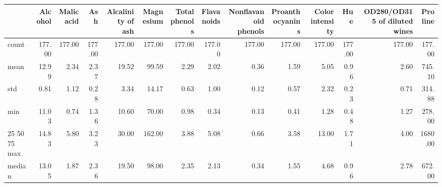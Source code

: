 \begin{tabular}{lrrrrrrrrrrrrr}
\toprule
 & Alcohol & Malic acid & Ash & Alcalinity of ash & Magnesium & Total phenols & Flavanoids & Nonflavanoid phenols & Proanthocyanins & Color intensity & Hue & OD280/OD315 of diluted wines & Proline \\
\midrule
count & 177.00 & 177.00 & 177.00 & 177.00 & 177.00 & 177.00 & 177.00 & 177.00 & 177.00 & 177.00 & 177.00 & 177.00 & 177.00 \\
mean & 12.99 & 2.34 & 2.37 & 19.52 & 99.59 & 2.29 & 2.02 & 0.36 & 1.59 & 5.05 & 0.96 & 2.60 & 745.10 \\
std & 0.81 & 1.12 & 0.28 & 3.34 & 14.17 & 0.63 & 1.00 & 0.12 & 0.57 & 2.32 & 0.23 & 0.71 & 314.88 \\
min & 11.03 & 0.74 & 1.36 & 10.60 & 70.00 & 0.98 & 0.34 & 0.13 & 0.41 & 1.28 & 0.48 & 1.27 & 278.00 \\
25%
50%
75%
max & 14.83 & 5.80 & 3.23 & 30.00 & 162.00 & 3.88 & 5.08 & 0.66 & 3.58 & 13.00 & 1.71 & 4.00 & 1680.00 \\
median & 13.05 & 1.87 & 2.36 & 19.50 & 98.00 & 2.35 & 2.13 & 0.34 & 1.55 & 4.68 & 0.96 & 2.78 & 672.00 \\
\bottomrule
\end{tabular}

